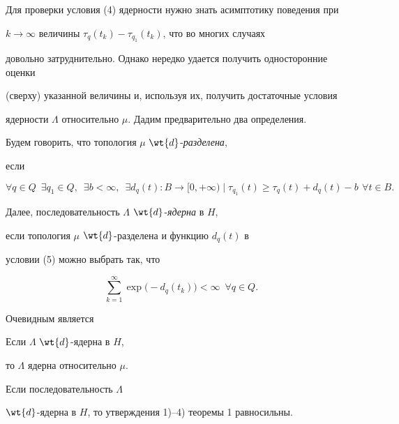Для проверки условия (4) ядерности нужно знать асимптотику поведения при


$k\to\infty$ величины $\tau_q(t_k)-\tau_{q_1}(t_k)$, что во многих случаях


довольно затруднительно. Однако нередко удается получить односторонние оценки


(сверху) указанной величины и, используя их, получить достаточные условия


ядерности $\Lambda$ относительно $\mu$. Дадим предварительно два определения.





Будем говорить, что топология $\mu$\; $\wt{d}$-{\it разделена},


если 


\begin{equation}


\forall q\in Q\ \; \exists q_1\in Q,\ \; \exists b<\infty,\ \;


\exists d_{q}(t): B\longrightarrow[0,+\infty)\mid


\tau_{q_1}(t) \geqslant \tau_q(t)+d_q(t)-b\ \, \forall t\in B.


\end{equation}


Далее, последовательность $\Lambda$\; $\wt{d}$-{\it ядерна} в $H$,


если топология $\mu$\; $\wt{d}$-разделена и функцию $d_q(t)$ в


условии (5) можно выбрать так, что


$$


\sum\limits_{k=1}^{\infty}


\exp\big(-d_{q}(t_k)\big)<\infty\ \; \forall q\in Q.


$$





Очевидным является





\begin{prop}


Если $\Lambda$\; $\wt{d}$-ядерна в $H$,


то $\Lambda$ ядерна относительно $\mu$.


\end{prop}





\begin{cornonum}


Если последовательность $\Lambda$\;


$\wt{d}$-ядерна в $H$, то утверждения 1)--4) теоремы 1 равносильны.


\end{cornonum}





